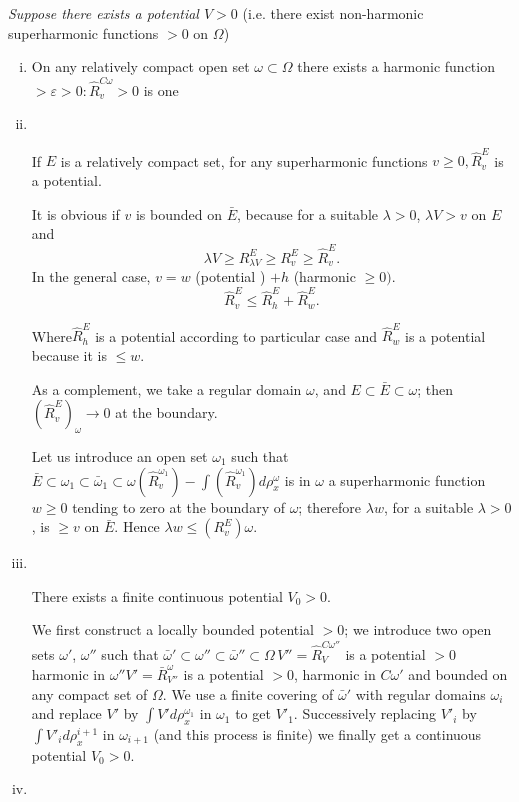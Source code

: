 \textit{Suppose there exists a potential $V > 0$} (i.e. there exist
non-harmonic superharmonic functions $> 0$ on $\Omega$) 
\begin{enumerate}[(i)]
\item On any relatively compact open set $\omega \subset \Omega$ there
  exists a harmonic function $> \varepsilon > 0 : \hat{R}^{C \omega}_v
  > 0$ is one 
\item 

~
\vskip -1.28cm \phantom{a}
  \begin{prop}\label{p4:chap4:sec21:prop10} %
    If $E$ is a relatively compact set, for any superharmonic functions
    $v \ge 0, \hat{R}^{E}_{v}$ is a potential. 
  \end{prop}

  It is obvious if $v$ is bounded on $\bar{E}$, because for a suitable
  $\lambda > 0$, $\lambda V > v$ on $E$ and  
  $$
  \lambda V \ge R^E_{\lambda V} \ge R^E_v \ge \hat{R}^E_v.
  $$
  In the general case, $v = w$ (potential ) $+ h$ (harmonic $\ge 0).$
  $$
  \hat{R}^E_v \le \hat{R}^E_h + \hat{R}^E_w.
  $$

  Where\pageoriginale $\hat{R}^E_h$ is a potential according to particular case and
  $\hat{R}^E_w$ is a potential because it is $\le w$. 
  
  As a complement, we take a regular domain $\omega$, and $E \subset
  \bar{E} \subset \omega$; then $(\hat{R}^E_v)_\omega \rightarrow 0$ at
  the boundary. 
  
  Let us introduce an open set $\omega_1$ such that $\bar{E} \subset
  \omega_1 \subset \bar{\omega}_1 \subset \omega (\hat{R}^{\omega_1}_v)
  - \int (\hat{R}^{\omega_1}_v) d \rho^\omega_x$ is in $\omega$ a
  superharmonic function $w \ge 0$ tending to zero at the boundary of
  $\omega$; therefore $\lambda w$, for a suitable $\lambda > 0$, is $\ge
  v$ on $\bar{E}$. Hence $\lambda w \le (R^E_v) \omega$. 
\item 

~
\vskip -1.24cm \phantom{a}
  \begin{prop}\label{p4:chap4:sec21:prop11} %
    There exists a finite continuous potential $V_0 > 0$.
  \end{prop}
  
  We first construct a locally bounded potential $> 0$; we introduce
  two open sets $\omega'$, $\omega''$ such that $\bar{\omega}' \subset
  \omega'' \subset \bar{\omega}'' \subset \Omega\,  V'' = \hat{R}^{C
    \omega''}_V$ is a potential $> 0$ harmonic in $\omega'' V ' =
  \bar{R}^\omega_{V''}$ is a potential $> 0$, harmonic in $C \omega'$
  and bounded on any compact set of $\Omega$. We use a finite covering
  of $\bar{\omega}'$ with regular domains $\omega_i$ and replace $V'$
  by $\int V' d \rho^{\omega_1}_x$ in $\omega_1$ to get
  $V'_1$. Successively replacing $V'_i$ by $\int V'_i d \rho^{i+1}_x$ in
  $\omega_{i + 1}$ (and this process is finite) we finally get a
  continuous potential $V_0 > 0$. 
\item 


\end{enumerate}
